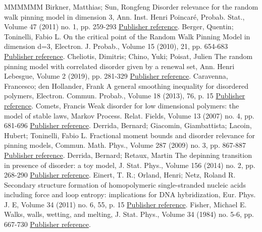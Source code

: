 \documentclass[11pt]{article}
\theoremstyle{definition}
\numberwithin{equation}{section}
\numberwithin{figure}{section}
\numberwithin{table}{section}
\begin{document}
\begin{thebibliography}{MMMMMM}
 Birkner, Matthias; Sun, Rongfeng Disorder relevance for the random walk pinning model in dimension 3, Ann. Inst. Henri Poincaré, Probab. Stat., Volume 47 (2011) no. 1, pp. 259-293 \href{https://ahl.centre-mersenne.org/item/AHL_2020__3__299_0/#cf:BS2}{Publisher reference}.
 Berger, Quentin; Toninelli, Fabio L. On the critical point of the Random Walk Pinning Model in dimension d=3, Electron. J. Probab., Volume 15 (2010), 21, pp. 654-683 \href{https://ahl.centre-mersenne.org/item/AHL_2020__3__299_0/#cf:BT10}{Publisher reference}.
 Cheliotis, Dimitris; Chino, Yuki; Poisat, Julien The random pinning model with correlated disorder given by a renewal set, Ann. Henri Lebesgue, Volume 2 (2019), pp. 281-329 \href{https://ahl.centre-mersenne.org/item/AHL_2020__3__299_0/#cf:CCP17}{Publisher reference}.
 Caravenna, Francesco; den Hollander, Frank A general smoothing inequality for disordered polymers, Electron. Commun. Probab., Volume 18 (2013), 76, p. 15 \href{https://ahl.centre-mersenne.org/item/AHL_2020__3__299_0/#cf:CH13}{Publisher reference}.
 Comets, Francis Weak disorder for low dimensional polymers: the model of stable laws, Markov Process. Relat. Fields, Volume 13 (2007) no. 4, pp. 681-696 \href{https://ahl.centre-mersenne.org/item/AHL_2020__3__299_0/#cf:Co07}{Publisher reference}.
 Derrida, Bernard; Giacomin, Giambattista; Lacoin, Hubert; Toninelli, Fabio L. Fractional moment bounds and disorder relevance for pinning models, Commun. Math. Phys., Volume 287 (2009) no. 3, pp. 867-887 \href{https://ahl.centre-mersenne.org/item/AHL_2020__3__299_0/#cf:DGLT09}{Publisher reference}.
 Derrida, Bernard; Retaux, Martin The depinning transition in presence of disorder: a toy model, J. Stat. Phys., Volume 156 (2014) no. 2, pp. 268-290 \href{https://ahl.centre-mersenne.org/item/AHL_2020__3__299_0/#cf:DR}{Publisher reference}.
 Einert, T. R.; Orland, Henri; Netz, Roland R. Secondary structure formation of homopolymeric single-stranded nucleic acids including force and loop entropy: implications for DNA hybridization, Eur. Phys. J. E, Volume 34 (2011) no. 6, 55, p. 15 \href{https://ahl.centre-mersenne.org/item/AHL_2020__3__299_0/#cf:EON11}{Publisher reference}.
 Fisher, Michael E. Walks, walls, wetting, and melting, J. Stat. Phys., Volume 34 (1984) no. 5-6, pp. 667-730 \href{https://ahl.centre-mersenne.org/item/AHL_2020__3__299_0/#cf:Fisher}{Publisher reference}.

\end{thebibliography}
\end{document}
